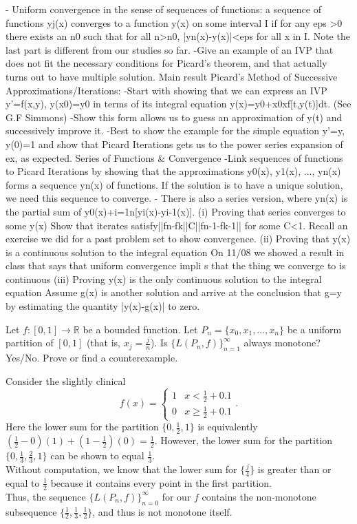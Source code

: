 \documentclass[11 pt]{article}
\begin{document}
	- Uniform convergence in the sense of sequences of functions: a sequence of functions {yj(x)} converges to a function y(x) on some interval I if for any eps >0 there exists an n0 such that for all n>n0, |yn(x)-y(x)|<eps for all x in I. Note the last part is different from our studies so far.
	-Give an example of an IVP that does not fit the necessary conditions for Picard’s theorem, and that actually turns out to have multiple solution.
Main result
	Picard’s Method of Successive Approximations/Iterations:
-Start with showing that we can express an IVP y'=f(x,y), y(x0)=y0  in terms of its integral equation y(x)=y0+x0xf[t,y(t)]dt. (See G.F Simmons)
-Show this form allows us to guess an approximation of y(t) and successively improve it.
-Best to show the example for the simple equation y'=y, y(0)=1 and show that Picard Iterations gets us to the power series expansion of ex, as expected.
	Series of Functions & Convergence
-Link sequences of functions to Picard Iterations by showing that the approximations y0(x), y1(x), ..., yn(x) forms a sequence {yn(x)} of functions. If the solution is to have a unique solution, we need this sequence to converge.
- There is also a series version, where yn(x) is the partial sum of  y0(x)+i=1n[yi(x)-yi-1(x)].
	(i) Proving that series converges to some y(x)
Show that iterates satisfy||fn-fk||C||fn-1-fk-1|| for some C<1. Recall an exercise we did for a past problem set to show convergence.
	(ii) Proving that y(x) is a continuous solution to the integral equation
On 11/08 we showed a result in class that says that uniform convergence impli s that the thing we converge to is continuous
	(iii) Proving y(x) is the only continuous solution to the integral equation
	Assume g(x) is another solution and arrive at the conclusion that g=y by estimating the quantity |y(x)-g(x)| to zero.
\pagebreak
\begin{problem}
	Let $f:[0,1]\to\mathbb{R}$ be a bounded function. Let $P_n=\{x_0,x_1,\dots,x_n\}$ be a uniform partition of $[0,1]$ (that is, $x_j=\frac{j}{n}$). Is $\{L(P_n,f)\}_{n=1}^{\infty}$ always monotone? Yes/No. Prove or find a counterexample.
\end{problem}
\begin{solution}
	Consider the slightly clinical \[
	f(x) = \begin{cases}
	1 & x<\frac{1}{2}+0.1 \\
	0 & x\geq\frac{1}{2}+0.1
	\end{cases}
.\]
	Here the lower sum for the partition $\{0,\frac{1}{2},1\}$ is equivalently $(\frac{1}{2}-0)(1)+(1-\frac{1}{2})(0)=\frac{1}{2}$. However, the lower sum for the partition $\{0,\frac{1}{3},\frac{2}{3}, 1\}$ can be shown to equal $\frac{1}{3}$.\\
	Without computation, we know that the lower sum for $\{\frac{j}{4}\}$ is greater than or equal to $\frac{1}{2}$ because it contains every point in the first partition.\\
	Thus, the sequence $\{L(P_n,f)\}_{n=0}^{\infty}$ for our $f$ contains the non-monotone subsequence $\{\frac{1}{2},\frac{1}{3},\frac{1}{2}\}$, and thus is not monotone itself.
\end{solution}
\end{document}

